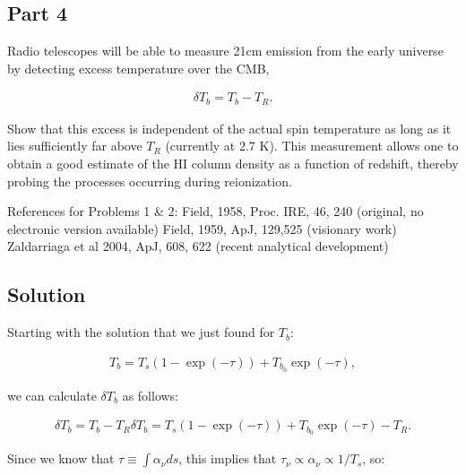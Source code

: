 \documentclass[12pt]{article}
\begin{document}

\subsection*{Part 4}

Radio telescopes will be able to measure 21cm emission from the early universe by detecting excess temperature over the CMB,

\begin{align*}
\delta T_b = T_b - T_R.
\end{align*}

Show that this excess is independent of the actual spin temperature as long as it lies sufficiently far above $T_R$ (currently at 2.7 K). This measurement allows one to obtain a good estimate of the $\mathrm{HI}$ column density as a function of redshift, thereby probing the processes occurring during reionization.

References for Problems 1 & 2:
Field, 1958, Proc. IRE, 46, 240 (original, no electronic version available)
Field, 1959, ApJ, 129,525 (visionary work)
Zaldarriaga et al 2004, ApJ, 608, 622 (recent analytical development)


\subsection*{Solution}

Starting with the solution that we just found for $T_b$:

\begin{align*}
T_b = T_s(1-\exp(-\tau)) + T_{b_0}\exp(-\tau),
\end{align*}

we can calculate $\delta T_b$ as follows:

\begin{equation*}
\begin{split}
\delta T_b = T_b - T_R
\delta T_b = T_s(1-\exp(-\tau)) + T_{b_0}\exp(-\tau) - T_R.
\end{split}
\end{equation*}

Since we know that $\tau \equiv \int\alpha_\nu ds$, this implies that $\tau_\nu \propto \alpha_\nu \propto 1/T_s$, so:
\end{document}
